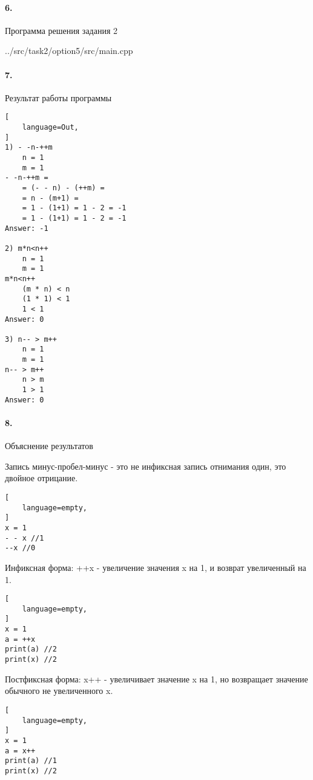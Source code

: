 \paragraph{6.} Программа решения задания 2


{../src/task2/option5/src/main.cpp}

\newpage

\paragraph{7.} Результат работы программы

\begin{lstlisting}[
    language=Out,
]
1) - -n-++m
	n = 1
	m = 1
- -n-++m = 
	= (- - n) - (++m) = 
	= n - (m+1) = 
	= 1 - (1+1) = 1 - 2 = -1
	= 1 - (1+1) = 1 - 2 = -1
Answer: -1

2) m*n<n++
	n = 1
	m = 1
m*n<n++
	(m * n) < n
	(1 * 1) < 1
	1 < 1
Answer: 0

3) n-- > m++
	n = 1
	m = 1
n-- > m++
	n > m
	1 > 1
Answer: 0
\end{lstlisting}

\paragraph{8.} Объяснение результатов

Запись минус-пробел-минус - это не инфиксная запись отнимания один, это двойное отрицание.

\begin{lstlisting}[
    language=empty,
]
x = 1
- - x //1
--x //0
\end{lstlisting}

Инфиксная форма: ++x - увеличение значения x на 1, и возврат увеличенный на 1.

\begin{lstlisting}[
    language=empty,
]
x = 1
a = ++x
print(a) //2
print(x) //2
\end{lstlisting}

Постфиксная форма: x++ - увеличивает значение x на 1, но возвращает значение обычного не увеличенного x.

\begin{lstlisting}[
    language=empty,
]
x = 1
a = x++
print(a) //1
print(x) //2
\end{lstlisting}